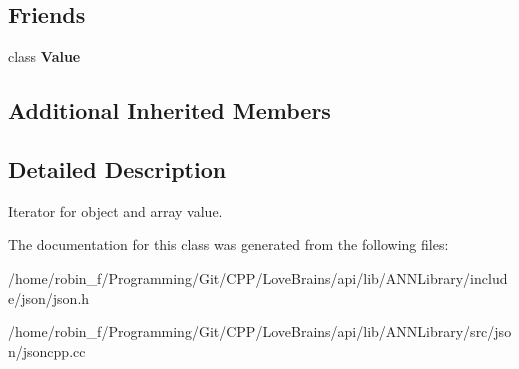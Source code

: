 \subsection*{Friends}
\begin{DoxyCompactItemize}
\item 
class {\bfseries Value}\label{class_json_1_1_value_iterator_a896c037a32087c5c20d97e64a1786880}

\end{DoxyCompactItemize}
\subsection*{Additional Inherited Members}


\subsection{Detailed Description}
Iterator for object and array value. 

The documentation for this class was generated from the following files\+:\begin{DoxyCompactItemize}
\item 
/home/robin\+\_\+f/\+Programming/\+Git/\+C\+P\+P/\+Love\+Brains/api/lib/\+A\+N\+N\+Library/include/json/json.\+h\item 
/home/robin\+\_\+f/\+Programming/\+Git/\+C\+P\+P/\+Love\+Brains/api/lib/\+A\+N\+N\+Library/src/json/jsoncpp.\+cc\end{DoxyCompactItemize}
